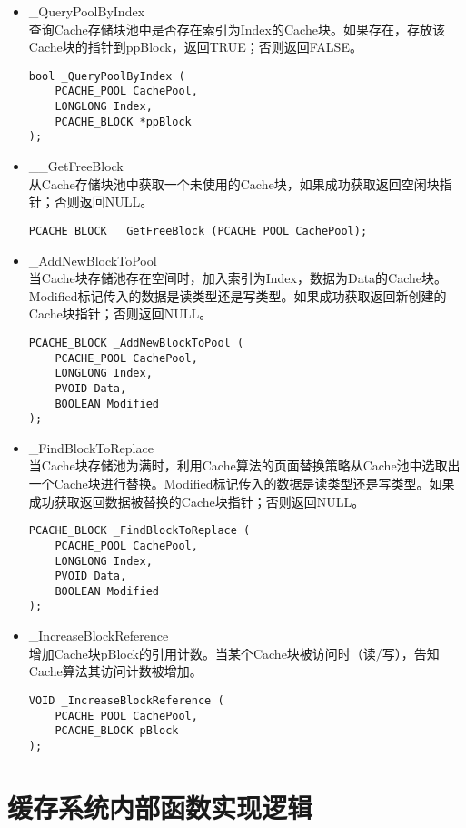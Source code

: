 \begin{itemize}

\item \_QueryPoolByIndex
\\查询Cache存储块池中是否存在索引为Index的Cache块。如果存在，存放该Cache块的指针到ppBlock，返回TRUE；否则返回FALSE。
\begin{lstlisting}
bool _QueryPoolByIndex (
    PCACHE_POOL CachePool,
    LONGLONG Index,
    PCACHE_BLOCK *ppBlock
);
\end{lstlisting}

\item \_\_GetFreeBlock
\\从Cache存储块池中获取一个未使用的Cache块，如果成功获取返回空闲块指针；否则返回NULL。
\begin{lstlisting}
PCACHE_BLOCK __GetFreeBlock (PCACHE_POOL CachePool);
\end{lstlisting}

\item \_AddNewBlockToPool
\\当Cache块存储池存在空间时，加入索引为Index，数据为Data的Cache块。Modified标记传入的数据是读类型还是写类型。如果成功获取返回新创建的Cache块指针；否则返回NULL。
\begin{lstlisting}
PCACHE_BLOCK _AddNewBlockToPool (
    PCACHE_POOL CachePool,
    LONGLONG Index,
    PVOID Data,
    BOOLEAN Modified
);
\end{lstlisting}

\item \_FindBlockToReplace
\\当Cache块存储池为满时，利用Cache算法的页面替换策略从Cache池中选取出一个Cache块进行替换。Modified标记传入的数据是读类型还是写类型。如果成功获取返回数据被替换的Cache块指针；否则返回NULL。
\begin{lstlisting}
PCACHE_BLOCK _FindBlockToReplace (
    PCACHE_POOL CachePool,
    LONGLONG Index,
    PVOID Data,
    BOOLEAN Modified
);
\end{lstlisting}

\item \_IncreaseBlockReference
\\增加Cache块pBlock的引用计数。当某个Cache块被访问时（读/写），告知Cache算法其访问计数被增加。
\begin{lstlisting}
VOID _IncreaseBlockReference (
    PCACHE_POOL CachePool,
    PCACHE_BLOCK pBlock
);
\end{lstlisting}

\end{itemize}

\section{缓存系统内部函数实现逻辑}
\label{sec:cache_internal}


